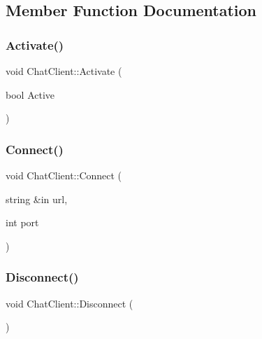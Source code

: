 \subsection{Member Function Documentation}
\hypertarget{class_chat_client_ac6a54ab6e35f4e35df689ce39b161e00}{}\label{class_chat_client_ac6a54ab6e35f4e35df689ce39b161e00} 
\subsubsection{\texorpdfstring{Activate()}{Activate()}}
{\footnotesize\ttfamily void Chat\+Client\+::\+Activate (\begin{DoxyParamCaption}\item[{bool}]{Active }\end{DoxyParamCaption})}

\hypertarget{class_chat_client_a44af52986be20c2060f7a1152d470ce2}{}\label{class_chat_client_a44af52986be20c2060f7a1152d470ce2} 
\subsubsection{\texorpdfstring{Connect()}{Connect()}}
{\footnotesize\ttfamily void Chat\+Client\+::\+Connect (\begin{DoxyParamCaption}\item[{string \&in}]{url,  }\item[{int}]{port }\end{DoxyParamCaption})}

\hypertarget{class_chat_client_a94275ac2799d57adf196deb905c5546d}{}\label{class_chat_client_a94275ac2799d57adf196deb905c5546d} 
\subsubsection{\texorpdfstring{Disconnect()}{Disconnect()}}
{\footnotesize\ttfamily void Chat\+Client\+::\+Disconnect (\begin{DoxyParamCaption}{ }\end{DoxyParamCaption})}

\hypertarget{class_chat_client_aebf7f14cb30dc6295614e8b43f534874}{}\label{class_chat_client_aebf7f14cb30dc6295614e8b43f534874} 
